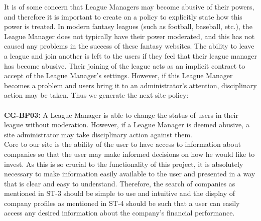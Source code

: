 It is of some concern that League Managers may become abusive of their powers, and therefore it is important to create on a policy to explicitly state how this power is treated. In modern fantasy leagues (such as football, baseball, etc.), the League Manager does not typically have their power moderated, and this has not caused any problems in the success of these fantasy websites. The ability to leave a league and join another is left to the users if they feel that their league manager has become abusive. Their joining of the league acts as an implicit contract to accept of the League Manager's settings. However, if this League Manager becomes a problem and users bring it to an administrator's attention, disciplinary action may be taken. Thus we generate the next site policy:\\ \\
\textbf{CG-BP03:} A League Manager is able to change the status of users in their league without moderation. However, if a League Manager is deemed abusive, a site administrator may take disciplinary action against them. \\

Core to our site is the ability of the user to have access to information about companies so that the user may make informed decisions on how he would like to invest. As this is so crucial to the functionality of this project, it is absolutely necessary to make information easily available to the user and presented in a way that is clear and easy to understand. Therefore, the search of companies as mentioned in ST-3 should be simple to use and intuitive and the display of company profiles as mentioned in ST-4 should be such that a user can easily access any desired information about the company's financial performance. \\


